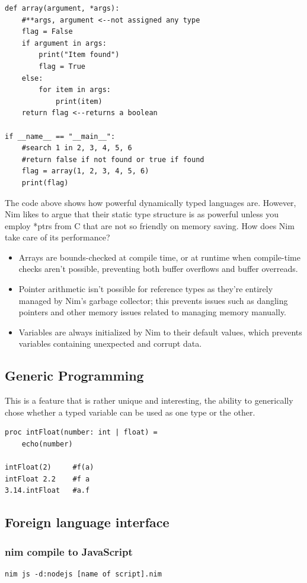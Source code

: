 \documentclass[10pt, a4paper, twocolumn]{article} %
\begin{document}
\begin{lstlisting}
def array(argument, *args):
    #**args, argument <--not assigned any type
	flag = False
	if argument in args:
		print("Item found")
		flag = True
	else:
		for item in args:
			print(item)
	return flag <--returns a boolean

if __name__ == "__main__":
	#search 1 in 2, 3, 4, 5, 6
	#return false if not found or true if found
	flag = array(1, 2, 3, 4, 5, 6)
	print(flag)
\end{lstlisting}

The code above shows how powerful dynamically typed languages are. However, Nim likes to argue that their static type structure is as powerful unless you employ *ptrs from C that are not so friendly on memory saving. How does Nim take care of its performance? 
\begin{itemize}
	\item Arrays are bounds-checked at compile time, or at runtime when compile-time checks aren’t possible, preventing both buffer overflows and buffer overreads.
	\item Pointer arithmetic isn’t possible for reference types as they’re entirely managed by Nim’s garbage collector; this prevents issues such as dangling pointers and other memory issues related to managing memory manually.
	\item Variables are always initialized by Nim to their default values, which prevents variables containing unexpected and corrupt data.
\end{itemize}

\subsection{Generic Programming}

This is a feature that is rather unique and interesting, the ability to generically chose whether a typed variable can be used as one type or the other. 

\begin{lstlisting}
proc intFloat(number: int | float) =
    echo(number)

intFloat(2)     #f(a)
intFloat 2.2    #f a
3.14.intFloat   #a.f
\end{lstlisting}
\subsection{Foreign language interface}

\subsubsection{nim compile to JavaScript}
\begin{lstlisting}
nim js -d:nodejs [name of script].nim
\end{lstlisting}
\end{document}
